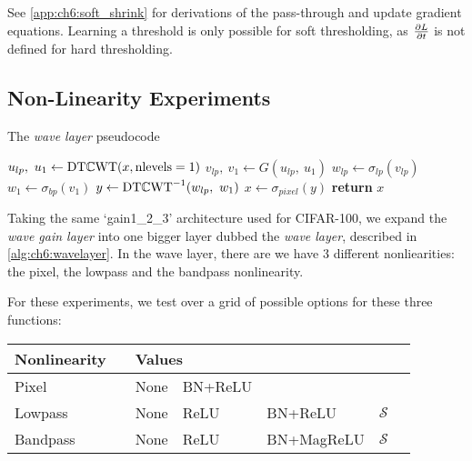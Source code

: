 See \autoref{app:ch6:soft_shrink} for derivations of the
pass-through and update gradient equations. Learning a threshold is only
possible for soft thresholding, as $\frac{\partial L}{\partial t}$ is not defined for hard
thresholding. 

\subsection{Non-Linearity Experiments}
\begin{algorithm}[t]
  \caption{The \emph{wave layer} pseudocode}\label{alg:ch6:wavelayer}
\begin{algorithmic}[1]
  \State $u_{lp},\ u_{1} \gets \mathrm{DT}\mathbb{C}\mathrm{WT}(x, \mbox{nlevels}=1) $ 
  \State $v_{lp},\ v_{1} \gets G(u_{lp},\ u_{1}) $ 
  \State $w_{lp} \gets \sigma_{lp}(v_{lp})$ 
  \State $w_{1} \gets \sigma_{bp}(v_{1})$ 
  \State $y \gets \mathrm{DT}\mathbb{C}\mathrm{WT}^{-1}(w_{lp},\ w_{1})$
  \State $x \gets \sigma_{pixel}(y)$ 
  \State \textbf{return} $x$
\EndProcedure
\end{algorithmic}
\end{algorithm}
Taking the same `gain1\_2\_3' architecture used for CIFAR-100, we expand the
\emph{wave gain layer} into one bigger layer
dubbed the \emph{wave layer}, described in \autoref{alg:ch6:wavelayer}. In the wave
layer, there are we have 3 different nonliearities: the pixel, the lowpass 
and the bandpass nonlinearity.

For these experiments, we test over a grid of possible options for these three
functions:
\begin{table}[h!]
  \centering
\begin{tabular}{l l l l l l l}
  \toprule
  Nonlinearity & \hphantom{abc} & \multicolumn{4}{l}{Values} \\
  \midrule
  Pixel && None & BN+ReLU \\
  Lowpass && None & ReLU & BN+ReLU & $\mathcal{S}$ \\
  Bandpass && None & ReLU & BN+MagReLU & $\mathcal{S}$ 
  \\\bottomrule
\end{tabular}
\end{table}

